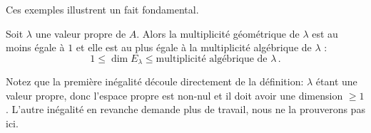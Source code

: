 Ces exemples illustrent un fait fondamental.

\begin{theorem}\label{thm:limitsmult}
Soit $\lambda$ une valeur propre de $A$.  Alors 
la multiplicité géométrique de $\lambda$ est au moins égale à $1$ et elle est
au plus égale à la multiplicité algébrique de $\lambda$ :
$$
1 \leq \dim E_\lambda \leq \textrm{multiplicité algébrique de $\lambda$}\,.
$$
\end{theorem}

Notez que la première inégalité découle directement de la définition: $\lambda$
étant une valeur propre, donc l'espace propre est non-nul et il
doit avoir une dimension $\geq1$. L'autre inégalité en revanche demande
plus de travail, nous ne la prouverons pas ici.



